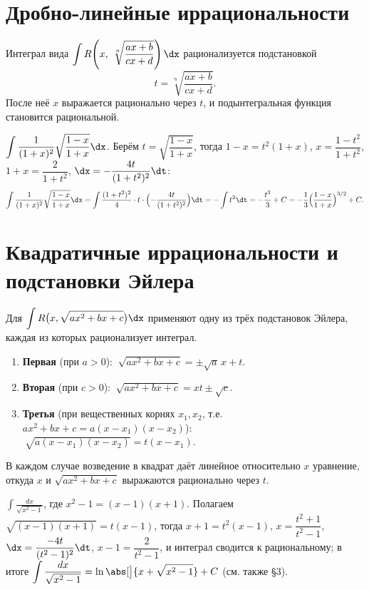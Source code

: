 \section{Дробно-линейные иррациональности}

Интеграл вида $\displaystyle\int R\!\left(x,\ \sqrt[n]{\dfrac{ax+b}{cx+d}}\right)\dx$ рационализуется
подстановкой
\[
  t=\sqrt[n]{\frac{ax+b}{cx+d}} .
\]
После неё $x$ выражается рационально через $t$, и подынтегральная функция становится рациональной.

\begin{example}
$\displaystyle\int\frac{1}{(1+x)^2}\sqrt{\frac{1-x}{1+x}}\dx$. Берём $t=\sqrt{\dfrac{1-x}{1+x}}$, тогда
$1-x=t^2(1+x)$, $x=\dfrac{1-t^2}{1+t^2}$, $1+x=\dfrac{2}{1+t^2}$, $\dx=-\dfrac{4t}{(1+t^2)^2}\dt$:
\[
  \int\frac{1}{(1+x)^2}\sqrt{\frac{1-x}{1+x}}\dx
   =\int\frac{(1+t^2)^2}{4}\cdot t\cdot\Bigl(-\frac{4t}{(1+t^2)^2}\Bigr)\dt
   =-\int t^2\dt=-\frac{t^3}{3}+C=-\frac13\Bigl(\frac{1-x}{1+x}\Bigr)^{3/2}+C.
\]
\end{example}

\section{Квадратичные иррациональности и подстановки Эйлера}

Для $\displaystyle\int R\bigl(x,\sqrt{ax^2+bx+c}\bigr)\dx$ применяют одну из трёх подстановок Эйлера,
каждая из которых рационализует интеграл.
\begin{enumerate}[label=\arabic*),leftmargin=*]
  \item \textbf{Первая} (при $a>0$): $\ \sqrt{ax^2+bx+c}=\pm\sqrt{a}\,x+t$.
  \item \textbf{Вторая} (при $c>0$): $\ \sqrt{ax^2+bx+c}=xt\pm\sqrt{c}$.
  \item \textbf{Третья} (при вещественных корнях $x_1,x_2$, т.е. $ax^2+bx+c=a(x-x_1)(x-x_2)$):
        $\ \sqrt{a(x-x_1)(x-x_2)}=t(x-x_1)$.
\end{enumerate}
В каждом случае возведение в квадрат даёт линейное относительно $x$ уравнение, откуда $x$ и
$\sqrt{ax^2+bx+c}$ выражаются рационально через $t$.

\begin{example}
$\displaystyle\int\frac{dx}{\sqrt{x^2-1}}$, где $x^2-1=(x-1)(x+1)$. Полагаем
$\sqrt{(x-1)(x+1)}=t(x-1)$, тогда $x+1=t^2(x-1)$, $x=\dfrac{t^2+1}{t^2-1}$,
$\dx=\dfrac{-4t}{(t^2-1)^2}\dt$, $x-1=\dfrac{2}{t^2-1}$, и интеграл сводится к рациональному; в
итоге $\displaystyle\int\frac{dx}{\sqrt{x^2-1}}=\ln\abs[\big]{x+\sqrt{x^2-1}}+C$ (см. также §3).
\end{example}

